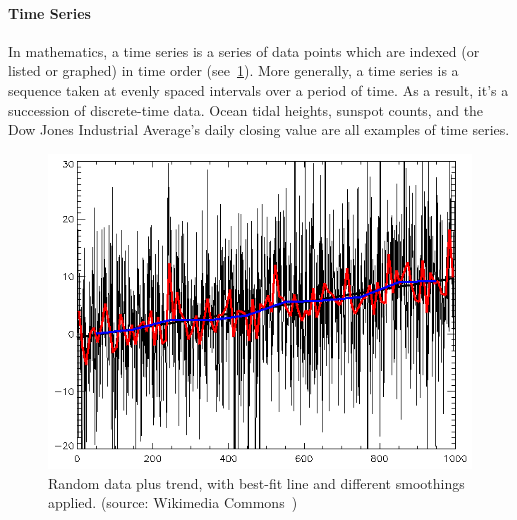 \paragraph{Time Series} In mathematics, a time series is a series of data points which are indexed (or listed or graphed) in time order (see~\ref{fig:random time-series}). More generally, a time series is a sequence taken at evenly spaced intervals over a period of time. As a result, it's a succession of discrete-time data. Ocean tidal heights, sunspot counts, and the Dow Jones Industrial Average's daily closing value are all examples of time series.
\begin{figure}[ht]
    \centering
    \includegraphics[width=\textwidth]{content/chapter_3/images/random-data-plus-trend-r2.png}
    \caption{Random data plus trend, with best-fit line and different smoothings applied. (source: Wikimedia Commons~\cite{file:random-data-plus-trend-r2})}
    \label{fig:random time-series}
\end{figure}
